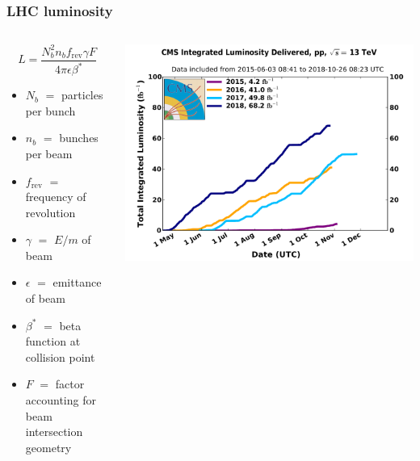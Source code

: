 \documentclass[aspectratio=169,xcolor=dvipsnames,,table,compress]{beamer}
\begin{document}
\begin{frame}\frametitle{LHC luminosity}
  \begin{columns}
    \begin{column}{0.6\textwidth}
      \[L = \frac{N_b^2 n_b f_\mathrm{rev} \gamma F}{4\pi\epsilon \beta^*}\]
    \begin{itemize}
        \item $N_b$ $=$ particles per bunch
        \item $n_b$ $=$ bunches per beam 
        \item $f_\mathrm{rev}$ $=$ frequency of revolution 
        \item $\gamma$ $=$ $E/m$ of beam 
        \item $\epsilon$ $=$ emittance of beam 
        \item $\beta^*$ $=$ beta function at collision point 
        \item $F$ $=$ factor accounting for beam intersection geometry
    \end{itemize}
    \end{column}
    \begin{column}{0.4\textwidth}
        \includegraphics[width=\textwidth]{../figures/cms/lumi.pdf}
    \end{column}
  \end{columns}
\end{frame}
\end{document}

